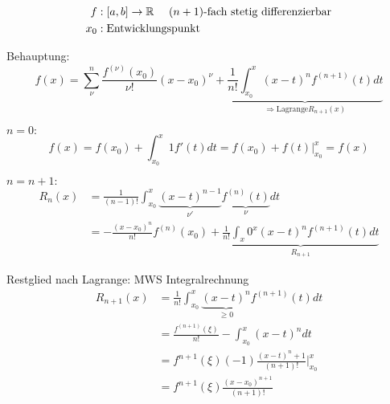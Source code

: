\begin{align*}
	f&: [a, b] \rightarrow \mathbb{R} \text{\hspace{10px} $(n+1)$-fach stetig differenzierbar} \\
	x_0&: \text{Entwicklungspunkt}
\end{align*}

Behauptung:
\begin{equation*}
	f(x) = \sum_{\nu}^n \frac{f^{(\nu)} (x_0)}{\nu !} (x - x_0)^{\nu} + \underbrace{\frac{1}{n!} \int_{x_0}^x (x - t)^n f^{(n+1)} (t) dt}_{\Rightarrow \text{Lagrange} R_{n+1}(x)}
\end{equation*}

$n=0:$
\begin{equation*}
	f(x) = f(x_0) + \int_{x_0}^x 1 f'(t) dt = f(x_0) + f(t) |_{x_0}^x = f(x)
\end{equation*}

$n = n+1:$
\begin{align*}
	R_n(x) &= \frac{1}{(n-1)!} \int_{x_0}^x \underbrace{(x-t)^{n-1}}_{\nu '} \underbrace{f^{(n)}(t)}_{\nu} dt\\
	&= - \frac{(x-x_0)^n}{n!} f^{(n)} (x_0) + \underbrace{\frac{1}{n!} \int_x0^x (x-t)^n f^{(n+1)} (t) dt}_{R_{n+1}}
\end{align*}

\begin{note}
	Restglied nach Lagrange: MWS Integralrechnung
	\begin{align*}
		R_{n+1} (x) &= \frac{1}{n!} \int_{x_0}^x \underbrace{(x-t)^n}_{\geq 0} f^{(n+1)} (t) dt \\
		&= \frac{f^{(n+1)}(\xi)}{n!} - \int_{x_0}^x (x-t)^n dt \\
		&= f^{n+1} (\xi) (-1) \frac{(x-t)^n+1}{(n+1)!}|_{x_0}^x \\
		&= f^{n+1} (\xi) \frac{(x-x_0)^{n+1}}{(n+1)!}
	\end{align*}
\end{note}






















